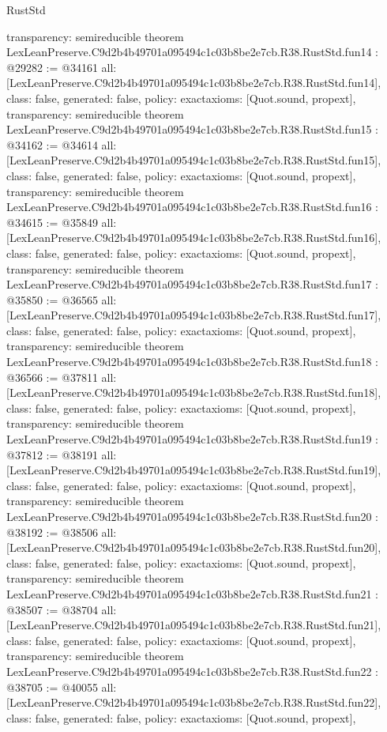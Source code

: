 \begin{lexlean}{RustStd}
\begin{coremodule}
{  transparency: semireducible
}
theorem LexLeanPreserve.C9d2b4b49701a095494c1c03b8be2e7cb.R38.RustStd.fun14 : @29282 := @34161 {
  all: [LexLeanPreserve.C9d2b4b49701a095494c1c03b8be2e7cb.R38.RustStd.fun14],
  class: false,
  generated: false,
  policy: exact{axioms: [Quot.sound, propext]},
  transparency: semireducible
}
theorem LexLeanPreserve.C9d2b4b49701a095494c1c03b8be2e7cb.R38.RustStd.fun15 : @34162 := @34614 {
  all: [LexLeanPreserve.C9d2b4b49701a095494c1c03b8be2e7cb.R38.RustStd.fun15],
  class: false,
  generated: false,
  policy: exact{axioms: [Quot.sound, propext]},
  transparency: semireducible
}
theorem LexLeanPreserve.C9d2b4b49701a095494c1c03b8be2e7cb.R38.RustStd.fun16 : @34615 := @35849 {
  all: [LexLeanPreserve.C9d2b4b49701a095494c1c03b8be2e7cb.R38.RustStd.fun16],
  class: false,
  generated: false,
  policy: exact{axioms: [Quot.sound, propext]},
  transparency: semireducible
}
theorem LexLeanPreserve.C9d2b4b49701a095494c1c03b8be2e7cb.R38.RustStd.fun17 : @35850 := @36565 {
  all: [LexLeanPreserve.C9d2b4b49701a095494c1c03b8be2e7cb.R38.RustStd.fun17],
  class: false,
  generated: false,
  policy: exact{axioms: [Quot.sound, propext]},
  transparency: semireducible
}
theorem LexLeanPreserve.C9d2b4b49701a095494c1c03b8be2e7cb.R38.RustStd.fun18 : @36566 := @37811 {
  all: [LexLeanPreserve.C9d2b4b49701a095494c1c03b8be2e7cb.R38.RustStd.fun18],
  class: false,
  generated: false,
  policy: exact{axioms: [Quot.sound, propext]},
  transparency: semireducible
}
theorem LexLeanPreserve.C9d2b4b49701a095494c1c03b8be2e7cb.R38.RustStd.fun19 : @37812 := @38191 {
  all: [LexLeanPreserve.C9d2b4b49701a095494c1c03b8be2e7cb.R38.RustStd.fun19],
  class: false,
  generated: false,
  policy: exact{axioms: [Quot.sound, propext]},
  transparency: semireducible
}
theorem LexLeanPreserve.C9d2b4b49701a095494c1c03b8be2e7cb.R38.RustStd.fun20 : @38192 := @38506 {
  all: [LexLeanPreserve.C9d2b4b49701a095494c1c03b8be2e7cb.R38.RustStd.fun20],
  class: false,
  generated: false,
  policy: exact{axioms: [Quot.sound, propext]},
  transparency: semireducible
}
theorem LexLeanPreserve.C9d2b4b49701a095494c1c03b8be2e7cb.R38.RustStd.fun21 : @38507 := @38704 {
  all: [LexLeanPreserve.C9d2b4b49701a095494c1c03b8be2e7cb.R38.RustStd.fun21],
  class: false,
  generated: false,
  policy: exact{axioms: [Quot.sound, propext]},
  transparency: semireducible
}
theorem LexLeanPreserve.C9d2b4b49701a095494c1c03b8be2e7cb.R38.RustStd.fun22 : @38705 := @40055 {
  all: [LexLeanPreserve.C9d2b4b49701a095494c1c03b8be2e7cb.R38.RustStd.fun22],
  class: false,
  generated: false,
  policy: exact{axioms: [Quot.sound, propext]},
}
\end{coremodule}
\end{lexlean}
